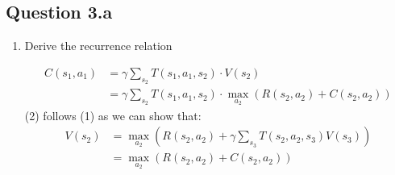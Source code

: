 \documentclass[12pt]{article}
\begin{document}
\subsection*{Question 3.a}
\begin{enumerate}
    \item{Derive the recurrence relation} \vspace{4pt} \\
    \begin{tcolorbox}[fit,height=12cm, width=\textwidth, blank, borderline={1pt}{-2pt},nobeforeafter]
    \begin{align}
    C(s_1,a_1) & = \gamma\sum_{s_2}T(s_1,a_1,s_2)\cdot V(s_2)\\
    & =  \gamma\sum_{s_2}T(s_1,a_1,s_2) \cdot \max_{a_2} ( R(s_2, a_2) + C(s_2, a_2))
    \end{align}
    (2) follows (1) as we can show that:
    \begin{align}
    V(s_2) & = \max_{a_2} \left( R(s_2,a_2) + \gamma \sum_{s_3}T(s_2, a_2, s_3)V(s_3) \right)\\
    & = \max_{a_2} \left( R(s_2,a_2) + C(s_2,a_2) \right)
    \end{align}


\end{tcolorbox}
\end{enumerate}
\end{document}
